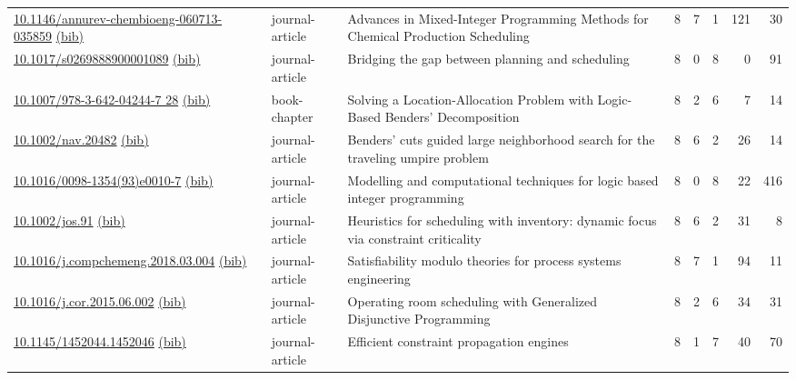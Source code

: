 {\begin{longtable}{p{5cm}lp{11cm}rrrrr}
\href{http://dx.doi.org/10.1146/annurev-chembioeng-060713-035859}{10.1146/annurev-chembioeng-060713-035859} \href{https://www.doi2bib.org/bib/10.1146/annurev-chembioeng-060713-035859}{(bib)} & journal-article & Advances in Mixed-Integer Programming Methods for Chemical Production Scheduling & 8 & 7 & 1 & 121 & 30 \\
\href{http://dx.doi.org/10.1017/s0269888900001089}{10.1017/s0269888900001089} \href{https://www.doi2bib.org/bib/10.1017/s0269888900001089}{(bib)} & journal-article & Bridging the gap between planning and scheduling & 8 & 0 & 8 & 0 & 91 \\
\href{http://dx.doi.org/10.1007/978-3-642-04244-7_28}{10.1007/978-3-642-04244-7 28} \href{https://www.doi2bib.org/bib/10.1007/978-3-642-04244-7_28}{(bib)} & book-chapter & Solving a Location-Allocation Problem with Logic-Based Benders' Decomposition & 8 & 2 & 6 & 7 & 14 \\
\href{http://dx.doi.org/10.1002/nav.20482}{10.1002/nav.20482} \href{https://www.doi2bib.org/bib/10.1002/nav.20482}{(bib)} & journal-article & Benders' cuts guided large neighborhood search for the traveling umpire problem & 8 & 6 & 2 & 26 & 14 \\
\href{http://dx.doi.org/10.1016/0098-1354(93)e0010-7}{10.1016/0098-1354(93)e0010-7} \href{https://www.doi2bib.org/bib/10.1016/0098-1354(93)e0010-7}{(bib)} & journal-article & Modelling and computational techniques for logic based integer programming & 8 & 0 & 8 & 22 & 416 \\
\href{http://dx.doi.org/10.1002/jos.91}{10.1002/jos.91} \href{https://www.doi2bib.org/bib/10.1002/jos.91}{(bib)} & journal-article & Heuristics for scheduling with inventory: dynamic focus via constraint criticality & 8 & 6 & 2 & 31 & 8 \\
\href{http://dx.doi.org/10.1016/j.compchemeng.2018.03.004}{10.1016/j.compchemeng.2018.03.004} \href{https://www.doi2bib.org/bib/10.1016/j.compchemeng.2018.03.004}{(bib)} & journal-article & Satisfiability modulo theories for process systems engineering & 8 & 7 & 1 & 94 & 11 \\
\href{http://dx.doi.org/10.1016/j.cor.2015.06.002}{10.1016/j.cor.2015.06.002} \href{https://www.doi2bib.org/bib/10.1016/j.cor.2015.06.002}{(bib)} & journal-article & Operating room scheduling with Generalized Disjunctive Programming & 8 & 2 & 6 & 34 & 31 \\
\href{http://dx.doi.org/10.1145/1452044.1452046}{10.1145/1452044.1452046} \href{https://www.doi2bib.org/bib/10.1145/1452044.1452046}{(bib)} & journal-article & Efficient constraint propagation engines & 8 & 1 & 7 & 40 & 70 \\

\end{longtable}}
